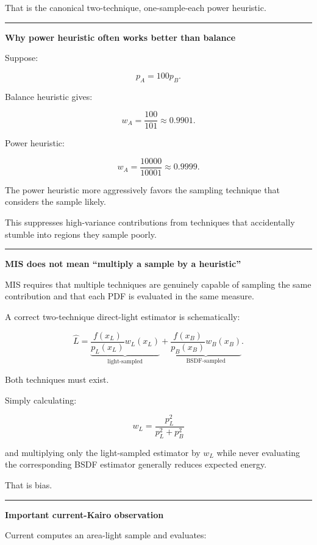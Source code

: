 That is the canonical two-technique, one-sample-each power heuristic.

\begin{center}\rule{0.5\linewidth}{0.5pt}\end{center}

\textbf{Why power heuristic often works better than balance}

Suppose:

\[
p_A=100p_B.
\]

Balance heuristic gives:

\[
w_A
=
\frac{100}{101}
\approx0.9901.
\]

Power heuristic:

\[
w_A
=
\frac{10000}{10001}
\approx0.9999.
\]

The power heuristic more aggressively favors the sampling technique that considers the sample likely.

This suppresses high-variance contributions from techniques that accidentally stumble into regions they sample poorly.

\begin{center}\rule{0.5\linewidth}{0.5pt}\end{center}

\textbf{MIS does not mean ``multiply a sample by a heuristic''}

MIS requires that multiple techniques are genuinely capable of sampling the same contribution and that each PDF is evaluated in the same measure.

A correct two-technique direct-light estimator is schematically:

\[
\hat L=
\underbrace{
\frac{
f(x_L)
}{
p_L(x_L)
}
w_L(x_L)
}_{\text{light-sampled}}
+
\underbrace{
\frac{
f(x_B)
}{
p_B(x_B)
}
w_B(x_B)
}_{\text{BSDF-sampled}}.
\]

Both techniques must exist.

Simply calculating:

\[
w_L
=
\frac{p_L^2}{p_L^2+p_B^2}
\]

and multiplying only the light-sampled estimator by \(w_L\) while never evaluating the corresponding BSDF estimator generally reduces expected energy.

That is bias.

\begin{center}\rule{0.5\linewidth}{0.5pt}\end{center}

\textbf{Important current-Kairo observation}

Current  computes an area-light sample and evaluates:

